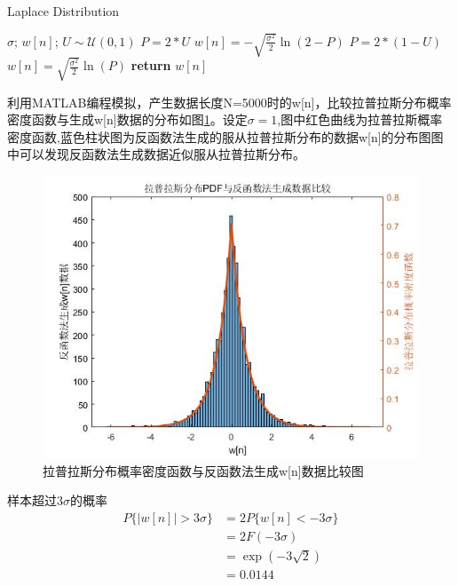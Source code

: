 \documentclass[fontset=windows]{article}
\numberwithin{figure}{section}
\begin{document}
\begin{algorithm}[H]
	\caption{Laplace Distribution}
	\label{Laplace}
	\begin{algorithmic}[1]
		\REQUIRE \(\sigma\);
		\ENSURE \(w[n]\);
		\STATE \(U\sim \mathcal{U}(0,1)\)
		\STATE \(P=2*U\)
		\STATE \(w[n]=-\sqrt{\frac{\sigma^2}{2}}\ln(2-P)\)
		\ELSE
		\STATE \(P=2*(1-U)\)
		\STATE \(w[n]=\sqrt{\frac{\sigma^2}{2}}\ln(P)\)
		\ENDIF
		\STATE \textbf{return} \(w[n]\)
	\end{algorithmic}
\end{algorithm}

利用MATLAB编程模拟，产生数据长度N=5000时的w[n]，比较拉普拉斯分布概率密度函数与生成w[n]数据的分布如图\ref*{fig:1}。设定\(\sigma=1\),图中红色曲线为拉普拉斯概率密度函数,蓝色柱状图为反函数法生成的服从拉普拉斯分布的数据w[n]的分布图图中可以发现反函数法生成数据近似服从拉普拉斯分布。

\begin{figure}[H]
	\centering
	\includegraphics[scale=0.5]{1.jpg}
	\caption{拉普拉斯分布概率密度函数与反函数法生成w[n]数据比较图}
	\label{fig:1}
\end{figure}

样本超过\(3\sigma\)的概率
\begin{align*}
	P\{\vert w[n]\vert >3\sigma\}
	 & =2P\{w[n]<-3\sigma\} \\
	 & =2F(-3\sigma)        \\
	 & =\exp(-3\sqrt{2})    \\
	 & =0.0144
\end{align*}
\end{document}
